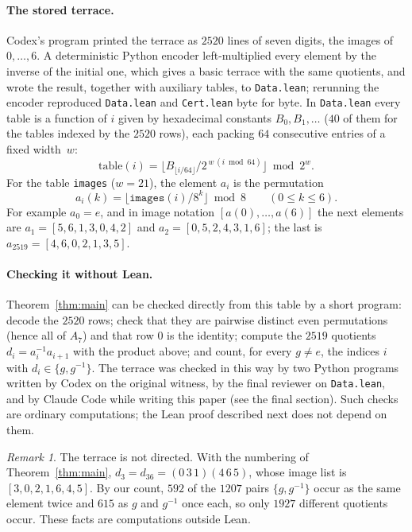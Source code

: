 \documentclass[11pt]{article}
\theoremstyle{definition}
\theoremstyle{remark}
\newtheorem{remark}{Remark}
\newcommand{\Alt}{A_7}
\begin{document}
\paragraph{The stored terrace.}
Codex's program printed the terrace as $2520$ lines of seven digits, the images
of $0,\dots,6$. A deterministic Python encoder left-multiplied every element
by the inverse of the initial one, which gives a basic terrace with the same
quotients, and wrote the result, together with auxiliary tables, to
\texttt{Data.lean}; rerunning the encoder reproduced \texttt{Data.lean} and
\texttt{Cert.lean} byte for byte. In \texttt{Data.lean} every table is a function of $i$ given by
hexadecimal constants $B_0,B_1,\dots$ ($40$ of them for the tables indexed by
the $2520$ rows), each packing $64$ consecutive entries of a fixed width~$w$:
\[
\mathrm{table}(i)=\bigl\lfloor B_{\lfloor i/64\rfloor}\big/2^{\,w\,(i\bmod 64)}\bigr\rfloor\bmod 2^{w}.
\]
For the table \texttt{images} ($w=21$), the element $a_i$ is the permutation
\[
a_i(k)=\bigl\lfloor \mathtt{images}(i)/8^{k}\bigr\rfloor\bmod 8\qquad(0\le k\le 6).
\]
For example $a_0=e$, and in image notation $[a(0),\dots,a(6)]$ the next
elements are $a_1=[5,6,1,3,0,4,2]$ and $a_2=[0,5,2,4,3,1,6]$; the last is
$a_{2519}=[4,6,0,2,1,3,5]$.

\paragraph{Checking it without Lean.}
Theorem~\ref{thm:main} can be checked directly from this table by a short
program: decode the $2520$ rows; check that they are pairwise distinct even
permutations (hence all of $\Alt$) and that row $0$ is the identity; compute
the $2519$ quotients $d_i=a_i^{-1}a_{i+1}$ with the product above; and count,
for every $g\ne e$, the indices $i$ with $d_i\in\{g,g^{-1}\}$. The terrace was
checked in this way by two Python programs written by Codex on the original
witness, by the final reviewer on \texttt{Data.lean}, and by Claude Code
while writing this paper (see the final section). Such checks are ordinary
computations; the Lean proof described next does not depend on them.

\begin{remark}\label{rem:notdirected}
The terrace is not directed. With the numbering of Theorem~\ref{thm:main},
$d_3=d_{36}=(0\,3\,1)(4\,6\,5)$, whose image list is $[3,0,2,1,6,4,5]$. By
our count, $592$ of the $1207$ pairs $\{g,g^{-1}\}$ occur as the same element
twice and $615$ as $g$ and $g^{-1}$ once each, so only $1927$ different
quotients occur. These facts are computations outside Lean.
\end{remark}
\end{document}
